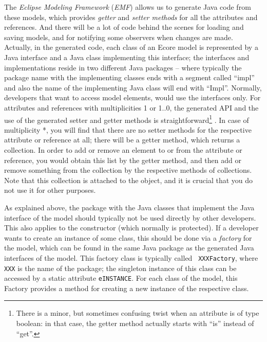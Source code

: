 %  
The \emph{Eclipse Modeling Framework} (\emph{EMF}) \cite{BSM06} allows us to
generate Java code from these models, which provides \emph{getter}%
and \emph{setter methods}%
for all the attributes and references. And there will be a lot of code behind
the scenes for loading and saving models, and for notifying some observers when
changes are made. Actually, in the generated code, each class of an Ecore model
is represented by a Java interface and a Java class implementing this interface;
the interfaces and implementations reside in two different Java packages --
where typically the package name with the implementing classes ends with a segment called ``impl'' and also
the name of the implementing Java class will end with ``Impl''. Normally, developers that want to access
model elements, would use the interfaces only. For attributes and references
with multiplicities 1 or 1..0, the generated API and the use of the generated
setter and getter methods is straightforward\footnote 
  {There is a minor, but sometimes confusing twist when an attribute is
   of type boolean: in that case, the getter method actually starts with
   ``is'' instead of ``get''.}%
.  In case of multiplicity *, you will find that there are no setter methods
for the respective attribute or reference at all; there will be a getter method,
which returns a collection. In order to add or remove an element to or from the
attribute or reference, you would obtain this list by the getter method, and
then add or remove something from the collection by the respective methods of
collections. Note that this collection is attached to the object, and it is
crucial that you do not use it for other purposes.  

As explained above, the package with the Java classes that implement the
Java interface of the model should typically not be used directly by other
developers. This also applies to the constructor (which normally is protected).
If a developer wants to create an instance of some class, this should be
done via a \emph{factory}%
for the model, which can be found in the same Java package as the generated Java
interfaces of the model. This factory class is typically called {\tt
XXXFactory}, where  {\tt XXX} is the name of the package; the singleton
instance of this class can be accessed by a static attribute {\tt eINSTANCE}.
For each class of the model, this Factory provides a method for creating
a new instance of the respective class.%

